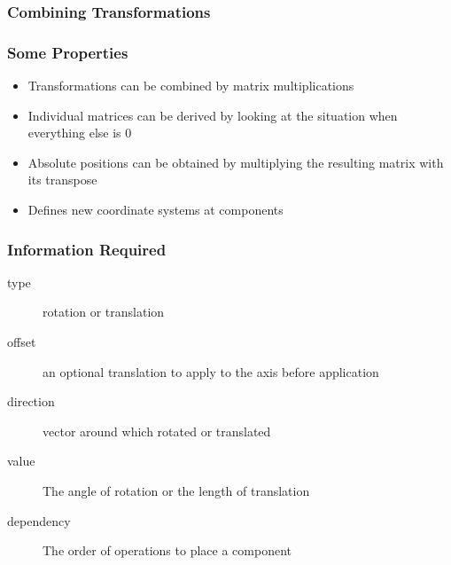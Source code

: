 \documentclass{beamer}
\begin{document}
\begin{frame} \frametitle{Combining Transformations}
\begin{figure}[!ht]
\end{figure}
\end{frame}

\begin{frame} \frametitle{Some Properties}
\begin{itemize}
\item Transformations can be combined by matrix multiplications
\item Individual matrices can be derived by looking at the situation when everything else is 0
\item Absolute positions can be obtained by multiplying the resulting matrix with its transpose
\item Defines new coordinate systems at components
\end{itemize}
\end{frame}



\begin{frame} \frametitle{Information Required}
\begin{description}
\item[type] rotation or translation
\item[offset] an optional translation to apply to the axis before application
\item[direction] vector around which rotated or translated
\item[value] The angle of rotation or the length of translation
\item[dependency] The order of operations to place a component
\end{description}
\end{frame}
\end{document}
